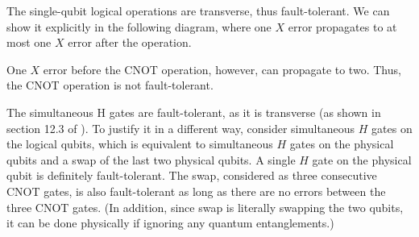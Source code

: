 The single-qubit logical operations are transverse, thus fault-tolerant. 
We can show it explicitly in the following diagram, where one $X$ error propagates to at most one $X$ error after the operation.

One $X$ error before the CNOT operation, however, can propagate to two. Thus, the CNOT operation is not fault-tolerant.

The simultaneous H gates are fault-tolerant, as it is transverse (as shown in section 12.3 of \cite{kissinger}).
To justify it in a different way, consider simultaneous $H$ gates on the logical qubits, which is equivalent to simultaneous $H$ gates on the physical qubits and a swap of the last two physical qubits.
A single $H$ gate on the physical qubit is definitely fault-tolerant. 
The swap, considered as three consecutive CNOT gates, is also fault-tolerant as long as there are no errors between the three CNOT gates.
(In addition, since swap is literally swapping the two qubits, it can be done physically if ignoring any quantum entanglements.)

